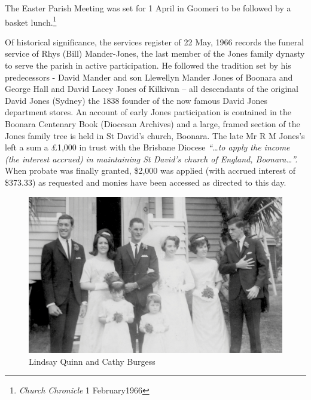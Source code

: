 The Easter Parish Meeting was set for 1 April in Goomeri to be followed by a basket lunch.\footnote{\emph{Church Chronicle} 1 February1966}


Of historical significance, the services register of 22 May, 1966 records the funeral service of Rhys (Bill) Mander-Jones, the last member of the Jones family dynasty to serve the parish in active participation. He followed the tradition set by his predecessors - David Mander and son Llewellyn Mander Jones of Boonara and George Hall and David Lacey Jones of Kilkivan -- all descendants of the original David Jones (Sydney) the 1838 founder of the now famous David Jones department stores. An account of early Jones participation is contained in the Boonara Centenary Book (Diocesan Archives) and a large, framed section of the Jones family tree is held in St David's church, Boonara. The late Mr R M Jones's left a sum a \pounds1,000 in trust with the Brisbane Diocese \emph{``\ldots to apply the income (the interest accrued) in maintaining St David's church of England, Boonara\ldots''.} When probate was finally granted, \$2,000 was applied (with accrued interest of \$373.33) as requested and monies have been accessed as directed to this day.









\begin{figure}[!htb]
\begin{center}
\includegraphics[width=1.\textwidth,center]{../images/LindsayQuinnCathyBurgessWedding.jpg}
\caption{Lindsay Quinn and Cathy Burgess}
\end{center}
\end{figure}




